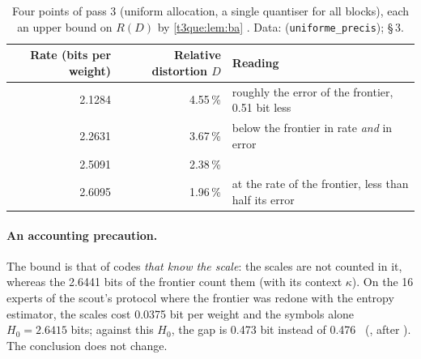 \begin{table}[tbp]
\centering\small
\begin{tabular}{r r l}
\toprule
Rate (bits per weight) & Relative distortion $D$ & Reading \\
\midrule
2.1284 & 4.55\,\% & roughly the error of the frontier, 0.51 bit less \\
2.2631 & 3.67\,\% & below the frontier in rate \emph{and} in error \\
2.5091 & 2.38\,\% & \\
2.6095 & 1.96\,\% & at the rate of the frontier, less than half its error \\
\bottomrule
\end{tabular}
\caption[Four points of the rate--distortion bound]{Four points of pass 3 (uniform allocation, a single quantiser for all blocks), each an upper bound on $R(D)$ by \cref{t3que:lem:ba} \mes. Data:  (\texttt{uniforme\_precis});  §\,3.}
\label{t3que:tab:borne}
\end{table}

\paragraph{An accounting precaution.} The bound is that of codes \emph{that know the scale}: the scales are not counted in it, whereas the 2.6441 bits of the frontier count them (with its context $\kappa$). On the 16 experts of the scout's protocol where the frontier was redone with the entropy estimator, the scales cost 0.0375 bit per weight and the symbols alone $H_0 = 2.6415$ bits; against this $H_0$, the gap is 0.473 bit instead of 0.476 \calc~(, after ). The conclusion does not change.

